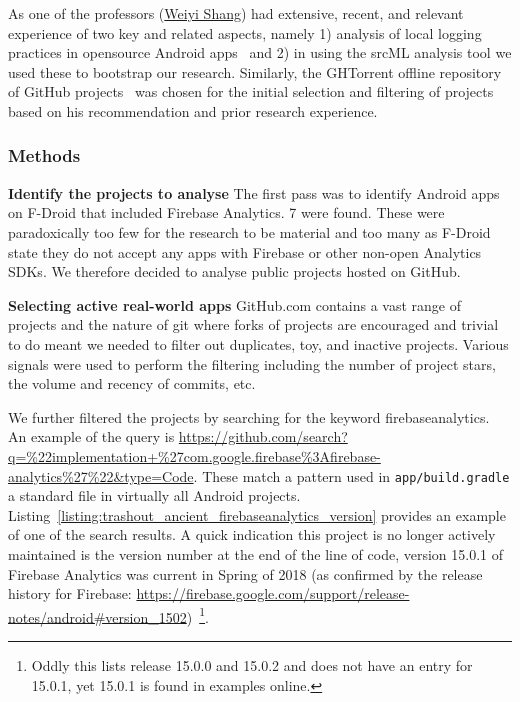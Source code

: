 As one of the professors (\href{https://users.encs.concordia.ca/~shang/}{Weiyi Shang}) had extensive, recent, and relevant experience of two key and related aspects, namely 1) analysis of local logging practices in opensource Android apps~\citep{zeng2019studying_logging_practices_fdroid} and 2) in using the srcML analysis tool we used these to bootstrap our research. Similarly, the GHTorrent offline repository of GitHub projects~\citep{gousios2012_ghtorrent_githubs_data_from_a_firehose} was chosen for the initial selection and filtering of projects based on his recommendation and prior research experience. 

\subsubsection{Methods} 


\textbf{Identify the projects to analyse}
The first pass was to identify Android apps on F-Droid that included Firebase Analytics. 7 were found. These were paradoxically too few for the research to be material and too many as F-Droid state they do not accept any apps with Firebase or other non-open Analytics SDKs. We therefore decided to analyse public projects hosted on GitHub. 


\textbf{Selecting active real-world apps}
GitHub.com contains a vast range of projects and the nature of git where forks of projects are encouraged and trivial to do meant we needed to filter out duplicates, toy, and inactive projects. Various signals were used to perform the filtering including the number of project stars, the volume and recency of commits, etc.

We further filtered the projects by searching for the keyword firebaseanalytics. An example of the query is \url{https://github.com/search?q=\%22implementation+\%27com.google.firebase\%3Afirebase-analytics\%27\%22&type=Code}. These match a pattern used in \texttt{app/build.gradle} a standard file in virtually all Android projects. Listing~\ref{listing:trashout_ancient_firebaseanalytics_version} provides an example of one of the search results. A quick indication this project is no longer actively maintained is the version number at the end of the line of code, version 15.0.1 of Firebase Analytics was current in Spring of 2018 (as confirmed by the release history for Firebase: \url{https://firebase.google.com/support/release-notes/android#version_1502})~\footnote{Oddly this lists release 15.0.0 and 15.0.2 and does not have an entry for 15.0.1, yet 15.0.1 is found in examples online.}.

